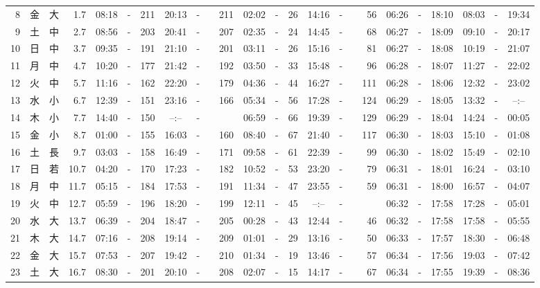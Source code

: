 \documentclass[12pt,a4j]{jsarticle}
\begin{document}
\begin{table}[htbp]
\begin{center}
{\begin{tabular}{|rc|cr|ccrccr|ccrccr|ccc|ccc|}
 8 & 金 & 大 &  1.7 &  08:18 &-& 211 &  20:13 &-& 211 &  02:02 &-&  26 &  14:16 &-&  56 & 06:26 & -& 18:10 & 08:03 & -& 19:34 \\
 9 & 土 & 中 &  2.7 &  08:56 &-& 203 &  20:41 &-& 207 &  02:35 &-&  24 &  14:45 &-&  68 & 06:27 & -& 18:09 & 09:10 & -& 20:17 \\
10 & 日 & 中 &  3.7 &  09:35 &-& 191 &  21:10 &-& 201 &  03:11 &-&  26 &  15:16 &-&  81 & 06:27 & -& 18:08 & 10:19 & -& 21:07 \\
11 & 月 & 中 &  4.7 &  10:20 &-& 177 &  21:42 &-& 192 &  03:50 &-&  33 &  15:48 &-&  96 & 06:28 & -& 18:07 & 11:27 & -& 22:02 \\
12 & 火 & 中 &  5.7 &  11:16 &-& 162 &  22:20 &-& 179 &  04:36 &-&  44 &  16:27 &-& 111 & 06:28 & -& 18:06 & 12:32 & -& 23:02 \\
13 & 水 & 小 &  6.7 &  12:39 &-& 151 &  23:16 &-& 166 &  05:34 &-&  56 &  17:28 &-& 124 & 06:29 & -& 18:05 & 13:32 & -& --:-- \\
14 & 木 & 小 &  7.7 &  14:40 &-& 150 &  --:-- &-&~~~~~ &  06:59 &-&  66 &  19:39 &-& 129 & 06:29 & -& 18:04 & 14:24 & -& 00:05 \\
15 & 金 & 小 &  8.7 &  01:00 &-& 155 &  16:03 &-& 160 &  08:40 &-&  67 &  21:40 &-& 117 & 06:30 & -& 18:03 & 15:10 & -& 01:08 \\
16 & 土 & 長 &  9.7 &  03:03 &-& 158 &  16:49 &-& 171 &  09:58 &-&  61 &  22:39 &-&  99 & 06:30 & -& 18:02 & 15:49 & -& 02:10 \\
17 & 日 & 若 & 10.7 &  04:20 &-& 170 &  17:23 &-& 182 &  10:52 &-&  53 &  23:20 &-&  79 & 06:31 & -& 18:01 & 16:24 & -& 03:10 \\
18 & 月 & 中 & 11.7 &  05:15 &-& 184 &  17:53 &-& 191 &  11:34 &-&  47 &  23:55 &-&  59 & 06:31 & -& 18:00 & 16:57 & -& 04:07 \\
19 & 火 & 中 & 12.7 &  05:59 &-& 196 &  18:20 &-& 199 &  12:11 &-&  45 &  --:-- &-&~~~~~ & 06:32 & -& 17:58 & 17:28 & -& 05:01 \\
20 & 水 & 大 & 13.7 &  06:39 &-& 204 &  18:47 &-& 205 &  00:28 &-&  43 &  12:44 &-&  46 & 06:32 & -& 17:58 & 17:58 & -& 05:55 \\
21 & 木 & 大 & 14.7 &  07:16 &-& 208 &  19:14 &-& 209 &  01:01 &-&  29 &  13:16 &-&  50 & 06:33 & -& 17:57 & 18:30 & -& 06:48 \\
22 & 金 & 大 & 15.7 &  07:53 &-& 207 &  19:42 &-& 210 &  01:34 &-&  19 &  13:46 &-&  57 & 06:34 & -& 17:56 & 19:03 & -& 07:42 \\
23 & 土 & 大 & 16.7 &  08:30 &-& 201 &  20:10 &-& 208 &  02:07 &-&  15 &  14:17 &-&  67 & 06:34 & -& 17:55 & 19:39 & -& 08:36 \\

\end{tabular}}
\end{center}
\end{table}
\end{document}
